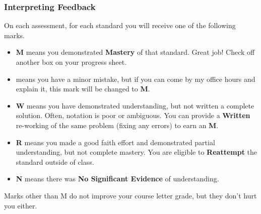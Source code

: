 \documentclass[aspectration=1610]{beamer}
\begin{document}
\begin{frame}\frametitle{Interpreting Feedback}
On each assessment, for each standard you will receive one of the following marks.
\begin{itemize}
\item {\bf M} means you demonstrated \textbf{Mastery} of that standard.
      Great job!  Check off another box on your progress sheet.
\item {\bf *} means you have a minor mistake, but if you can come by my office hours and explain it,
      this mark will be changed to {\bf M}.
\item {\bf W} means you have demonstrated understanding, but not written a complete solution.  Often, notation is poor or ambiguous.  You can provide a {\bf Written} re-working of the same problem (fixing any errors) to earn an {\bf M}.
\item {\bf R} means you made a good faith effort and demonstrated
      partial understanding, but not complete mastery. You are eligible to
      \textbf{Reattempt} the standard outside of class.
\item {\bf N} means there was \textbf{No Significant Evidence} of understanding.
\end{itemize}

\vspace{0.2in}

Marks other than M do not improve your course letter grade, but
they don't hurt you either.
\end{frame}
\end{document}
